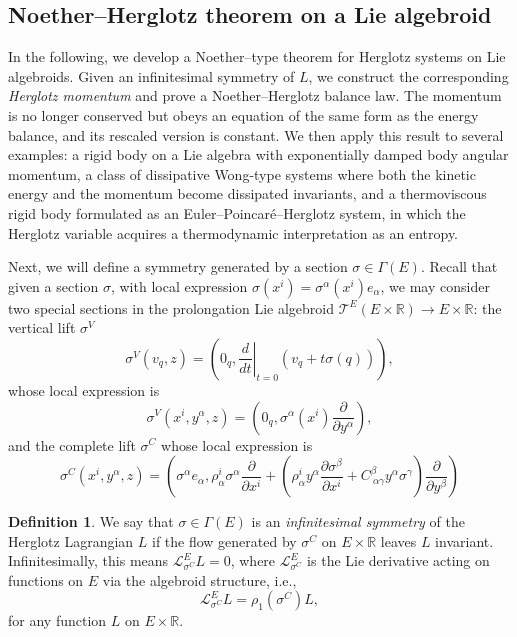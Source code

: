 \documentclass[11pt,a4paper]{article}
\theoremstyle{definition}
\newtheorem{definition}[theorem]{Definition}
\begin{document}
\subsection{Noether--Herglotz theorem on a Lie algebroid}

In the following, we develop a Noether--type theorem for
Herglotz systems on Lie algebroids.  Given an infinitesimal symmetry of
$L$, we construct the corresponding \emph{Herglotz momentum} and prove
a Noether--Herglotz balance law.
 The momentum is no longer conserved but obeys an equation of the same
form as the energy balance, and its rescaled version is
constant.  We then apply this result to several examples: a rigid body
on a Lie algebra with exponentially damped body angular momentum, a class
of dissipative Wong-type systems where both the kinetic energy and the
momentum become dissipated invariants, and a thermoviscous rigid
body formulated as an Euler--Poincar\'e--Herglotz system, in which the
Herglotz variable acquires a thermodynamic interpretation as an entropy.

Next, we will define a symmetry generated by a section $\sigma\in\Gamma(E)$. Recall that given a section $\sigma$, with local expression $\sigma(x^{i})=\sigma^{\alpha}(x^{i})e_{\alpha}$, we may consider two special sections in the prolongation Lie algebroid $\mathcal{T}^{E}(E\times \mathbb{R})\to E\times \mathbb{R}$: the vertical lift $\sigma^{V}$
$$\sigma^{V}(v_{q},z)=\left(0_{q},\left.\frac{d}{dt}\right|_{t=0}(v_{q}+t\sigma(q))\right),$$
whose local expression is
$$\sigma^{V}(x^{i},y^{\alpha},z)=\left(0_{q},\sigma^{\alpha}(x^{i})\frac{\partial}{\partial y^{\alpha}}\right),$$
and the complete lift $\sigma^{C}$ whose local expression is
$$\sigma^{C}(x^{i},y^{\alpha},z)=\left( \sigma^{\alpha}e_{\alpha}, \rho^{i}_\alpha \sigma^{\alpha}\frac{\partial}{\partial x^{i}} + \left(\rho^{i}_\alpha y^{\alpha}\frac{\partial \sigma^{\beta}}{\partial x^{i}} + C^\beta_{\ \alpha\gamma}y^\alpha\sigma^\gamma \right)\frac{\partial}{\partial y^{\beta}} \right)$$

\begin{definition}
We say that $\sigma\in\Gamma(E)$ is an \emph{infinitesimal symmetry}
of the Herglotz Lagrangian $L$ if the flow generated by $\sigma^{C}$ on $E\times\mathbb{R}$ leaves $L$ invariant. Infinitesimally, this means $\mathcal{L}_{\sigma^{C}}^E L = 0$, where $\mathcal{L}_{\sigma^{C}}^E$ is the Lie derivative act\-ing on functions on $E$ via the algebroid structure, i.e.,
$$\mathcal{L}_{\sigma^{C}}^E L = \rho_{1}(\sigma^{C})L,$$
for any function $L$ on $E\times \mathbb{R}$.
\end{definition}
\end{document}
